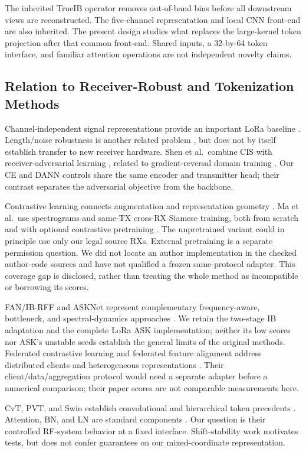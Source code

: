 \documentclass[journal]{IEEEtran}
\begin{document}
The inherited TrueIB operator removes out-of-band bins before all downstream views are reconstructed. The five-channel representation and local CNN front-end are also inherited. The present design studies what replaces the large-kernel token projection after that common front-end. Shared inputs, a 32-by-64 token interface, and familiar attention operations are not independent novelty claims.


\subsection{Relation to Receiver-Robust and Tokenization Methods}
Channel-independent signal representations provide an important LoRa baseline \cite{shen2022scalable}. Length/noise robustness is another related problem \cite{shen2023length}, but does not by itself establish transfer to new receiver hardware. Shen et al.\ combine CIS with receiver-adversarial learning \cite{shen2024receiver}, related to gradient-reversal domain training \cite{ganin2016domain}. Our CE and DANN controls share the same encoder and transmitter head; their contrast separates the adversarial objective from the backbone.

Contrastive learning connects augmentation and representation geometry \cite{chen2020simclr}. Ma et al.\ use spectrograms and same-TX cross-RX Siamese training, both from scratch and with optional contrastive pretraining \cite{ma2025wcnc,ma2025robust}. The unpretrained variant could in principle use only our legal source RXs. External pretraining is a separate permission question. We did not locate an author implementation in the checked author-code sources and have not qualified a frozen same-protocol adapter. This coverage gap is disclosed, rather than treating the whole method as incompatible or borrowing its scores.

FAN/IB-RFF and ASKNet represent complementary frequency-aware, bottleneck, and spectral-dynamics approaches \cite{wang2026ib,liu2026ask}. We retain the two-stage IB adaptation and the complete LoRa ASK implementation; neither its low scores nor ASK's unstable seeds establish the general limits of the original methods. Federated contrastive learning and federated feature alignment address distributed clients and heterogeneous representations \cite{shen2024federated,wang2026fedalign}. Their client/data/aggregation protocol would need a separate adapter before a numerical comparison; their paper scores are not comparable measurements here.

CvT, PVT, and Swin establish convolutional and hierarchical token precedents \cite{wu2021cvt,wang2021pvt,liu2021swin}. Attention, BN, and LN are standard components \cite{vaswani2017attention,ioffe2015batch,ba2016layer}. Our question is their controlled RF-system behavior at a fixed interface. Shift-stability work \cite{zhang2019shift} motivates tests, but does not confer guarantees on our mixed-coordinate representation.
\end{document}
